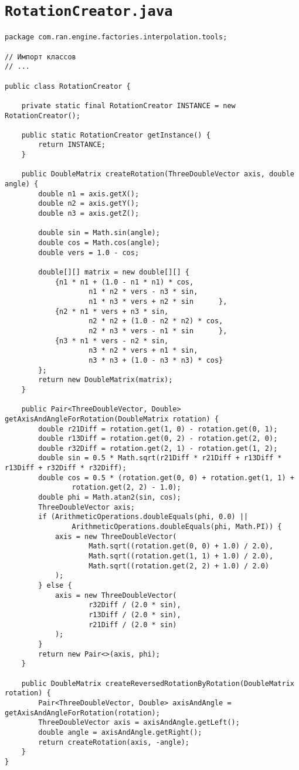 \section*{\texttt{RotationCreator.java}}
\begin{verbatim}
package com.ran.engine.factories.interpolation.tools;

// Импорт классов
// ...

public class RotationCreator {

    private static final RotationCreator INSTANCE = new RotationCreator();

    public static RotationCreator getInstance() {
        return INSTANCE;
    }

    public DoubleMatrix createRotation(ThreeDoubleVector axis, double angle) {
        double n1 = axis.getX();
        double n2 = axis.getY();
        double n3 = axis.getZ();

        double sin = Math.sin(angle);
        double cos = Math.cos(angle);
        double vers = 1.0 - cos;

        double[][] matrix = new double[][] {
            {n1 * n1 + (1.0 - n1 * n1) * cos,
                    n1 * n2 * vers - n3 * sin,
                    n1 * n3 * vers + n2 * sin      },
            {n2 * n1 * vers + n3 * sin,
                    n2 * n2 + (1.0 - n2 * n2) * cos,
                    n2 * n3 * vers - n1 * sin      },
            {n3 * n1 * vers - n2 * sin,
                    n3 * n2 * vers + n1 * sin,
                    n3 * n3 + (1.0 - n3 * n3) * cos}
        };
        return new DoubleMatrix(matrix);
    }

    public Pair<ThreeDoubleVector, Double> getAxisAndAngleForRotation(DoubleMatrix rotation) {
        double r21Diff = rotation.get(1, 0) - rotation.get(0, 1);
        double r13Diff = rotation.get(0, 2) - rotation.get(2, 0);
        double r32Diff = rotation.get(2, 1) - rotation.get(1, 2);
        double sin = 0.5 * Math.sqrt(r21Diff * r21Diff + r13Diff * r13Diff + r32Diff * r32Diff);
        double cos = 0.5 * (rotation.get(0, 0) + rotation.get(1, 1) +
                rotation.get(2, 2) - 1.0);
        double phi = Math.atan2(sin, cos);
        ThreeDoubleVector axis;
        if (ArithmeticOperations.doubleEquals(phi, 0.0) ||
                ArithmeticOperations.doubleEquals(phi, Math.PI)) {
            axis = new ThreeDoubleVector(
                    Math.sqrt((rotation.get(0, 0) + 1.0) / 2.0),
                    Math.sqrt((rotation.get(1, 1) + 1.0) / 2.0),
                    Math.sqrt((rotation.get(2, 2) + 1.0) / 2.0)
            );
        } else {
            axis = new ThreeDoubleVector(
                    r32Diff / (2.0 * sin),
                    r13Diff / (2.0 * sin),
                    r21Diff / (2.0 * sin)
            );
        }
        return new Pair<>(axis, phi);
    }

    public DoubleMatrix createReversedRotationByRotation(DoubleMatrix rotation) {
        Pair<ThreeDoubleVector, Double> axisAndAngle = getAxisAndAngleForRotation(rotation);
        ThreeDoubleVector axis = axisAndAngle.getLeft();
        double angle = axisAndAngle.getRight();
        return createRotation(axis, -angle);
    }
}
\end{verbatim}

